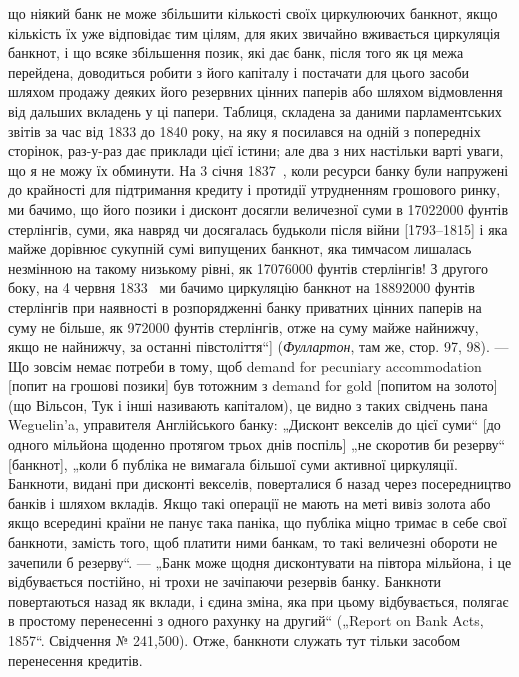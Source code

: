{що ніякий банк не може збільшити кількості своїх циркулюючих банкнот,
якщо кількість їх уже відповідає тим цілям, для яких звичайно вживається циркуляція
банкнот, і що всяке збільшення позик, які дає банк, після того як ця межа
перейдена, доводиться робити з його капіталу і постачати для цього засоби
шляхом продажу деяких його резервних цінних паперів або шляхом відмовлення
від дальших вкладень у ці папери. Таблиця, складена за даними парламентських
звітів за час від 1833 до 1840 року, на яку я посилався на одній з попередніх
сторінок, раз-у-раз дає приклади цієї істини; але два з них настільки варті уваги,
що я не можу їх обминути. На 3 січня 1837~, коли ресурси банку були
напружені до крайності для підтримання кредиту і протидії утрудненням
грошового ринку, ми бачимо, що його позики і дисконт досягли величезної
суми в \num{17022000} фунтів стерлінгів, суми, яка навряд чи досягалась будьколи
після війни [1793--1815] і яка майже дорівнює сукупній сумі випущених
банкнот, яка тимчасом лишалась незмінною на такому низькому рівні,
як \num{17076000} фунтів стерлінгів! З другого боку, на 4 червня 1833~ ми бачимо
циркуляцію банкнот на \num{18892000} фунтів стерлінгів при наявності в розпорядженні
банку приватних цінних паперів на суму не більше, як \num{972000} фунтів
стерлінгів, отже на суму майже найнижчу, якщо не найнижчу, за останні
півстоліття“] (\emph{Фуллартон}, там же, стор. 97, 98). — Що зовсім немає потреби
в тому, щоб demand for pecuniary accommodation [попит на грошові позики] був
тотожним з demand for gold [попитом на золото] (що Вільсон, Тук і інші називають
капіталом), це видно з таких свідчень пана Weguelin’a, управителя Англійського
банку: „Дисконт векселів до цієї суми“ [до одного мільйона щоденно
протягом трьох днів поспіль] „не скоротив би резерву“ [банкнот], „коли б публіка
не вимагала більшої суми активної циркуляції. Банкноти, видані при
дисконті векселів, поверталися б назад через посередництво банків і шляхом
вкладів. Якщо такі операції не мають на меті вивіз золота або якщо всередині
країни не панує така паніка, що публіка міцно тримає в себе свої банкноти,
замість того, щоб платити ними банкам, то такі величезні обороти не зачепили б
резерву“. — „Банк може щодня дисконтувати на півтора мільйона, і це відбувається
постійно, ні трохи не зачіпаючи резервів банку. Банкноти повертаються
назад як вклади, і єдина зміна, яка при цьому відбувається, полягає в простому
перенесенні з одного рахунку на другий“ („Report on Bank Acts, 1857“. Свідчення
№ 241,500). Отже, банкноти служать тут тільки засобом перенесення кредитів.
}

